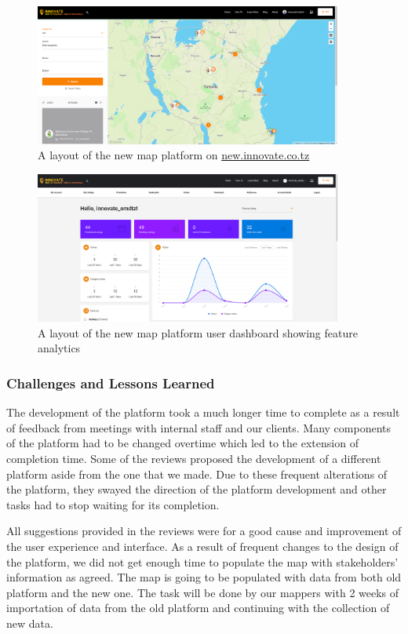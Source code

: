 \documentclass[a4paper,12pt,twoside]{article}
\begin{document}
\begin{figure}[h]
	\includegraphics[width=0.9\textwidth]{images/new_new_inno_map.png}
	\caption{A layout of the new map platform on \href{http://new.innovate.co.tz}{new.innovate.co.tz }}
\end{figure}
\begin{figure}[h]
	\includegraphics[width=0.9\textwidth]{images/dashboard.png}
	\caption{A layout of the new map platform user dashboard showing feature analytics }
\end{figure}

\subsubsection{Challenges and Lessons Learned}
The development of the platform took a much longer time to complete as a result of feedback from meetings with internal staff and our clients. Many components of the platform had to be changed overtime which led to the extension of completion time. Some of the reviews proposed the development of a different platform aside from the one that we made. Due to these frequent alterations of the platform, they swayed the direction of the platform development and other tasks had to stop waiting for its completion.

All suggestions provided in the reviews were for a good cause and improvement of the user experience and interface. As a result of frequent changes to the design of the platform, we did not get enough time to populate the map with stakeholders’ information as agreed. The map is going to be populated with data from both old platform and the new one. The task will be done by our mappers with 2 weeks of importation of data from the old platform and continuing with the collection of new data.
\end{document}
